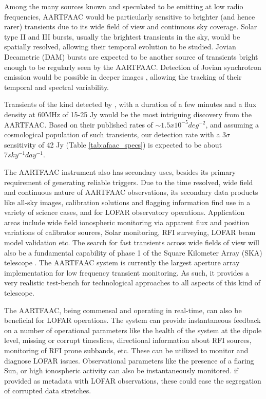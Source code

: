 \documentclass{ws-jai}
\begin{document}
  Among  the many  sources known  and  speculated to  be emitting  at low  radio
  frequencies, AARTFAAC would  be particularly sensitive to  brighter (and hence
  rarer) transients due  to its wide field of view  and continuous sky coverage.
  Solar type  II and III  bursts, usually the  brightest transients in  the sky,
  would be spatially resolved, allowing  their temporal evolution to be studied.
  Jovian Decametric (DAM) bursts are expected to be another source of transients
  bright  enough to  be regularly  seen by  the AARTFAAC.   Detection of  Jovian
  synchrotron    emission     would    be    possible    in     deeper    images
  \citep{girard2012jupiter,zarka2004fast},  allowing   the  tracking   of  their
  temporal and spectral variability.

  Transients of the  kind detected by \citep{stewart2016lofar},  with a duration
  of a  few minutes and a  flux density at 60MHz  of 15-25 Jy would  be the most
  intriguing  discovery from  the AARTFAAC.  Based on  their published  rates of
  $\sim1.5x10^{-5}  deg^{-2}$, and  assuming a  cosmological population  of such
  transients, our  detection rate with a  $3\sigma$ sensitivity of 42  Jy (Table
  \ref{tab:afaac_specs}) is expected to be about $7 sky^{-1}day^{-1}$.
       
The AARTFAAC instrument also has secondary uses, besides its primary requirement
of  generating reliable  triggers.  Due  to the  time resolved,  wide field  and
continuous nature  of AARTFAAC  observations, its  secondary data  products like
all-sky images,  calibration solutions  and flagging information  find use  in a
variety of  science cases,  and for  LOFAR observatory  operations.  Application
areas include wide  field ionospheric monitoring via apparent  flux and position
variations of  calibrator sources, Solar  monitoring, RFI surveying,  LOFAR beam
model validation etc. The search for  fast transients across wide fields of view
will also be a  fundamental capability of phase 1 of  the Square Kilometer Array
(SKA) telescope \cite{colegate2011searching}.  The  AARTFAAC system is currently
the  largest   aperture  array   implementation  for  low   frequency  transient
monitoring. As such,  it provides a very realistic  test-bench for technological
approaches to all aspects of this kind of telescope.

  The  AARTFAAC,  being  commensal  and  operating in  real-time,  can  also  be
  beneficial  for  LOFAR  operations.   The  system  can  provide  instantaneous
  feedback on a  number of operational parameters like the  health of the system
  at the  dipole level, missing  or corrupt timeslices,  directional information
  about  RFI sources,  monitoring  of RFI  prone subbands,  etc.   These can  be
  utilized to monitor and diagnose  LOFAR issues.  Observational parameters like
  the  presence of  a flaring  Sun,  or high  ionospheric activity  can also  be
  instantaneously monitored.   if provided as metadata  with LOFAR observations,
  these could ease the segregation of corrupted data stretches.
\end{document}
